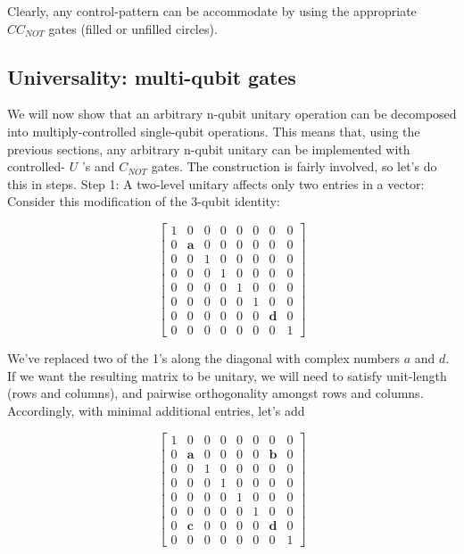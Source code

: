 \documentclass[main.tex]{subfiles}
\begin{document}
    Clearly, any control-pattern can be accommodate by using the appropriate $CC_{NOT}$ gates (filled or unfilled circles).

\subsection{Universality: multi-qubit gates}

    We will now show that an arbitrary n-qubit unitary operation can be decomposed into multiply-controlled single-qubit operations. This means that, using the previous sections, any arbitrary n-qubit unitary can be implemented with controlled- $U$ 's and $C_{N O T}$ gates. The construction is fairly involved, so let's do this in steps. Step 1: A two-level unitary affects only two entries in a vector: Consider this modification of the 3-qubit identity:
    
    $$
    \left[\begin{array}{llllllll}
    1 & 0 & 0 & 0 & 0 & 0 & 0 & 0 \\
    0 & \mathbf{a} & 0 & 0 & 0 & 0 & 0 & 0 \\
    0 & 0 & 1 & 0 & 0 & 0 & 0 & 0 \\
    0 & 0 & 0 & 1 & 0 & 0 & 0 & 0 \\
    0 & 0 & 0 & 0 & 1 & 0 & 0 & 0 \\
    0 & 0 & 0 & 0 & 0 & 1 & 0 & 0 \\
    0 & 0 & 0 & 0 & 0 & 0 & \mathbf{d} & 0 \\
    0 & 0 & 0 & 0 & 0 & 0 & 0 & 1
    \end{array}\right]
    $$
    
    We've replaced two of the 1's along the diagonal with complex numbers $a$ and $d$. If we want the resulting matrix to be unitary, we will need to satisfy unit-length (rows and columns), and pairwise orthogonality amongst rows and columns. Accordingly, with minimal additional entries, let's add
    
    $$
    \left[\begin{array}{llllllll}
    1 & 0 & 0 & 0 & 0 & 0 & 0 & 0 \\
    0 & \mathbf{a} & 0 & 0 & 0 & 0 & \mathbf{b} & 0 \\
    0 & 0 & 1 & 0 & 0 & 0 & 0 & 0 \\
    0 & 0 & 0 & 1 & 0 & 0 & 0 & 0 \\
    0 & 0 & 0 & 0 & 1 & 0 & 0 & 0 \\
    0 & 0 & 0 & 0 & 0 & 1 & 0 & 0 \\
    0 & \mathbf{c} & 0 & 0 & 0 & 0 & \mathbf{d} & 0 \\
    0 & 0 & 0 & 0 & 0 & 0 & 0 & 1
    \end{array}\right]
    $$
    
\end{document}

